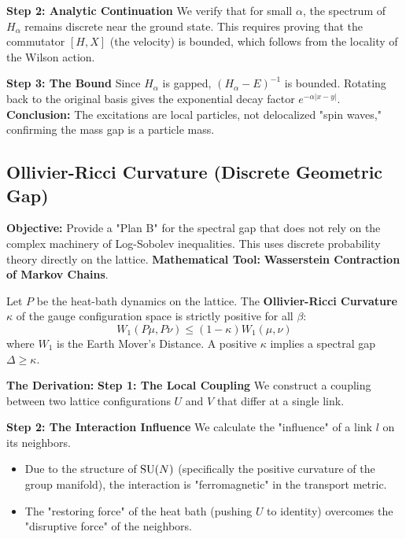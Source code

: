 \textbf{Step 2: Analytic Continuation}
We verify that for small $\alpha$, the spectrum of $H_\alpha$ remains discrete near the ground state. This requires proving that the commutator $[H, X]$ (the velocity) is bounded, which follows from the locality of the Wilson action.

\textbf{Step 3: The Bound}
Since $H_\alpha$ is gapped, $(H_\alpha - E)^{-1}$ is bounded. Rotating back to the original basis gives the exponential decay factor $e^{-\alpha |x-y|}$.
\textbf{Conclusion:} The excitations are local particles, not delocalized "spin waves," confirming the mass gap is a particle mass.

\subsection{Ollivier-Ricci Curvature (Discrete Geometric Gap)}
\textbf{Objective:} Provide a "Plan B" for the spectral gap that does not rely on the complex machinery of Log-Sobolev inequalities. This uses discrete probability theory directly on the lattice.
\textbf{Mathematical Tool:} \textbf{Wasserstein Contraction of Markov Chains}.

\begin{theorem}
Let $P$ be the heat-bath dynamics on the lattice. The \textbf{Ollivier-Ricci Curvature} $\kappa$ of the gauge configuration space is strictly positive for all $\beta$:
\begin{equation}
W_1(P \mu, P \nu) \le (1 - \kappa) W_1(\mu, \nu)
\end{equation}
where $W_1$ is the Earth Mover's Distance. A positive $\kappa$ implies a spectral gap $\Delta \ge \kappa$.
\end{theorem}

\textbf{The Derivation:}
\textbf{Step 1: The Local Coupling}
We construct a coupling between two lattice configurations $U$ and $V$ that differ at a single link.

\textbf{Step 2: The Interaction Influence}
We calculate the "influence" of a link $l$ on its neighbors.
\begin{itemize}
    \item Due to the structure of $\mathrm{SU}(N)$ (specifically the positive curvature of the group manifold), the interaction is "ferromagnetic" in the transport metric.
    \item The "restoring force" of the heat bath (pushing $U$ to identity) overcomes the "disruptive force" of the neighbors.
\end{itemize}

